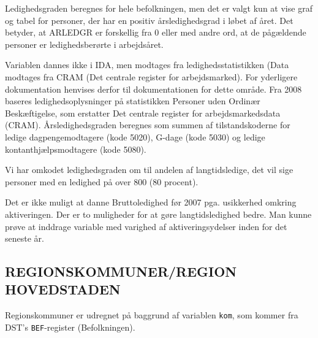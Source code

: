 Ledighedsgraden beregnes for hele befolkningen, men det er valgt kun at vise graf og tabel for personer, der har en positiv årsledighedsgrad i løbet af året. Det betyder, at ARLEDGR er forskellig fra 0 eller med andre ord, at de pågældende personer er ledighedsberørte i arbejdsåret.

Variablen dannes ikke i IDA, men modtages fra ledighedsstatistikken (Data modtages fra CRAM (Det centrale register for arbejdsmarked). For yderligere dokumentation henvises derfor til dokumentationen for dette område. Fra 2008 baseres ledighedsoplysninger på statistikken Personer uden Ordinær Beskæftigelse, som erstatter Det centrale register for arbejdsmarkedsdata (CRAM). Årsledighedsgraden beregnes som summen af tilstandskoderne for ledige dagpengemodtagere (kode 5020), G-dage (kode 5030) og ledige kontanthjælpsmodtagere (kode 5080).

Vi har omkodet ledighedsgraden om til andelen af langtidsledige, det vil sige personer med en ledighed på over 800 (80 procent).

Det er ikke muligt at danne Bruttoledighed før 2007 pga. usikkerhed omkring aktiveringen. Der er to muligheder for at gøre langtidsledighed bedre.
Man kunne prøve at inddrage variable med varighed af aktiveringsydelser inden for det seneste år. 



\subsection{REGIONSKOMMUNER/REGION HOVEDSTADEN \label{}}

Regionskommuner er udregnet på baggrund af variablen \texttt{kom}, som kommer fra DST's \texttt{BEF}-register (Befolkningen).

